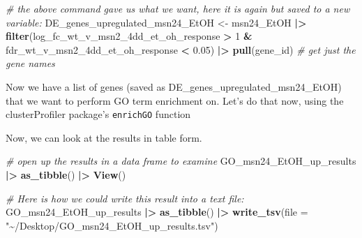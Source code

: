 \documentclass[
]{book}
\newenvironment{Shaded}{\begin{snugshade}}{\end{snugshade}}
\newcommand{\AttributeTok}[1]{\textcolor[rgb]{0.13,0.29,0.53}{#1}}
\newcommand{\CommentTok}[1]{\textcolor[rgb]{0.56,0.35,0.01}{\textit{#1}}}
\newcommand{\DecValTok}[1]{\textcolor[rgb]{0.00,0.00,0.81}{#1}}
\newcommand{\FloatTok}[1]{\textcolor[rgb]{0.00,0.00,0.81}{#1}}
\newcommand{\FunctionTok}[1]{\textcolor[rgb]{0.13,0.29,0.53}{\textbf{#1}}}
\newcommand{\NormalTok}[1]{#1}
\newcommand{\OtherTok}[1]{\textcolor[rgb]{0.56,0.35,0.01}{#1}}
\newcommand{\SpecialCharTok}[1]{\textcolor[rgb]{0.81,0.36,0.00}{\textbf{#1}}}
\newcommand{\StringTok}[1]{\textcolor[rgb]{0.31,0.60,0.02}{#1}}
\begin{document}
\begin{Shaded}
\begin{Highlighting}[]
\CommentTok{\# the above command gave us what we want, here it is again but saved to a new variable:}
\NormalTok{DE\_genes\_upregulated\_msn24\_EtOH }\OtherTok{\textless{}{-}} 
\NormalTok{  msn24\_EtOH }\SpecialCharTok{|\textgreater{}}
  \FunctionTok{filter}\NormalTok{(log\_fc\_wt\_v\_msn2\_4dd\_et\_oh\_response }\SpecialCharTok{\textgreater{}} \DecValTok{1} \SpecialCharTok{\&}\NormalTok{ fdr\_wt\_v\_msn2\_4dd\_et\_oh\_response }\SpecialCharTok{\textless{}} \FloatTok{0.05}\NormalTok{) }\SpecialCharTok{|\textgreater{}}
  \FunctionTok{pull}\NormalTok{(gene\_id) }\CommentTok{\# get just the gene names}
\end{Highlighting}
\end{Shaded}

Now we have a list of genes (saved as DE\_genes\_upregulated\_msn24\_EtOH) that we want to perform GO term enrichment on. Let's do that now, using the clusterProfiler package's \texttt{enrichGO} function

\begin{Shaded}
\end{Shaded}

Now, we can look at the results in table form.

\begin{Shaded}
\begin{Highlighting}[]
\CommentTok{\# open up the results in a data frame to examine}
\NormalTok{GO\_msn24\_EtOH\_up\_results }\SpecialCharTok{|\textgreater{}}
  \FunctionTok{as\_tibble}\NormalTok{() }\SpecialCharTok{|\textgreater{}}
  \FunctionTok{View}\NormalTok{()}

\CommentTok{\# Here is how we could write this result into a text file:}
\NormalTok{GO\_msn24\_EtOH\_up\_results }\SpecialCharTok{|\textgreater{}}
  \FunctionTok{as\_tibble}\NormalTok{() }\SpecialCharTok{|\textgreater{}}
  \FunctionTok{write\_tsv}\NormalTok{(}\AttributeTok{file =} \StringTok{"\textasciitilde{}/Desktop/GO\_msn24\_EtOH\_up\_results.tsv"}\NormalTok{)}
\end{Highlighting}
\end{Shaded}
\end{document}
